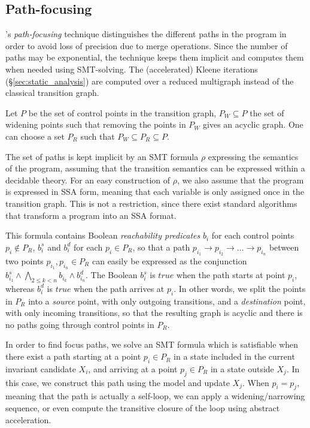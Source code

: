 \documentclass[preprint]{sigplanconf}
\begin{document}
\subsection{Path-focusing}
\label{sec:path_focusing}

\citet{Monniaux_Gonnord_SAS11}'s \emph{path-focusing} technique
distinguishes the different paths in the program in order to avoid loss of
precision due to merge operations. Since the number of paths may be exponential,
the technique keeps them implicit and computes them when needed using
SMT-solving.
The (accelerated) Kleene iterations (\S\ref{sec:static_analysis}) are computed over a reduced multigraph instead of the classical transition graph.

Let $P$ be the set of control points in the transition graph, 
$P_W \subseteq P$ the set of widening points
such that removing the points in $P_W$ gives an acyclic graph.
One can choose a set $P_R$ such that $P_W \subseteq P_R \subseteq P$.

The set of paths is kept implicit by an SMT formula $\rho$ expressing
the semantics of the program, assuming that the transition semantics can be
expressed within a decidable theory. For an easy construction of $\rho$, 
we also assume that the program is expressed in SSA form, meaning that each
variable is only assigned once in the transition graph. This is not a
restriction, since there exist standard algorithms that transform a program into
an SSA format.

This formula contains Boolean \emph{reachability predicates} $b_i$ for each
control points $p_i \notin P_R$, $b_i^s$ and $b_i^d$ for each $p_i \in P_R$, so
that a path 
$p_{i_1} \rightarrow p_{i_2} \rightarrow \dots \rightarrow p_{i_n}$ 
between two points $p_{i_1}, p_{i_n} \in P_R$ 
can easily be expressed as the
conjunction $b_{i_1}^s \wedge \bigwedge_{2 \leq k < n} b_{i_k} \wedge b_{i_n}^d$.
The Boolean $b_{i}^s$ is $true$ when the path starts at point $p_i$, whereas
$b_i^d$ is $true$ when the path arrives at $p_i$. In other words, we split the
points in $P_R$ into a \emph{source} point, with only outgoing transitions, and
a \emph{destination} point, with only incoming transitions, so that the
resulting graph is acyclic and there is no paths going through control
points in $P_R$.

In order to find focus paths, we solve an SMT formula which is satisfiable when
there exist a path starting at a point $p_i \in P_R$ in a state included in the
current invariant candidate $X_i$, and arriving at a point $p_j \in P_R$ in a
state outside $X_j$. In this case, we construct this path using the model and
update $X_j$. When $p_i = p_j$, meaning that the path is actually a self-loop,
we can apply a widening/narrowing sequence, or even compute the transitive
closure of the loop using abstract acceleration. %
\end{document}
